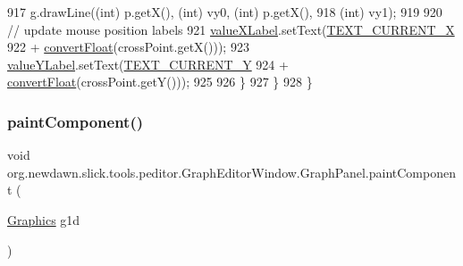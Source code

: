 \begin{DoxyCode}
917                     g.drawLine((\textcolor{keywordtype}{int}) p.getX(), (int) vy0, (\textcolor{keywordtype}{int}) p.getX(),
918                             (int) vy1);
919 
920                     \textcolor{comment}{// update mouse position labels}
921                     \mbox{\hyperlink{classorg_1_1newdawn_1_1slick_1_1tools_1_1peditor_1_1_graph_editor_window_ae5928b262b5762ca0e1dbe3c6ef39c36}{valueXLabel}}.setText(\mbox{\hyperlink{classorg_1_1newdawn_1_1slick_1_1tools_1_1peditor_1_1_graph_editor_window_aee9565b4a7a4256b262ea82309a010f8}{TEXT\_CURRENT\_X}}
922                             + \mbox{\hyperlink{classorg_1_1newdawn_1_1slick_1_1tools_1_1peditor_1_1_graph_editor_window_1_1_graph_panel_acd99b7572a8b9950eb701f306914eb3c}{convertFloat}}(crossPoint.getX()));
923                     \mbox{\hyperlink{classorg_1_1newdawn_1_1slick_1_1tools_1_1peditor_1_1_graph_editor_window_ab6fe6971331dbea14f52d4aef89519d7}{valueYLabel}}.setText(\mbox{\hyperlink{classorg_1_1newdawn_1_1slick_1_1tools_1_1peditor_1_1_graph_editor_window_ab3ed6cf89b62d2cf4c1047ff6d5ef6b5}{TEXT\_CURRENT\_Y}}
924                             + \mbox{\hyperlink{classorg_1_1newdawn_1_1slick_1_1tools_1_1peditor_1_1_graph_editor_window_1_1_graph_panel_acd99b7572a8b9950eb701f306914eb3c}{convertFloat}}(crossPoint.getY()));
925 
926                 \}
927             \}
928         \}
\end{DoxyCode}
\mbox{\label{classorg_1_1newdawn_1_1slick_1_1tools_1_1peditor_1_1_graph_editor_window_1_1_graph_panel_aec6f2a49dc598f14ae63d0bc0c385876}} 
\subsubsection{\texorpdfstring{paint\+Component()}{paintComponent()}}
{\footnotesize\ttfamily void org.\+newdawn.\+slick.\+tools.\+peditor.\+Graph\+Editor\+Window.\+Graph\+Panel.\+paint\+Component (\begin{DoxyParamCaption}\item[{\mbox{\hyperlink{classorg_1_1newdawn_1_1slick_1_1_graphics}{Graphics}}}]{g1d }\end{DoxyParamCaption})\hspace{0.3cm}{\ttfamily [inline]}}

